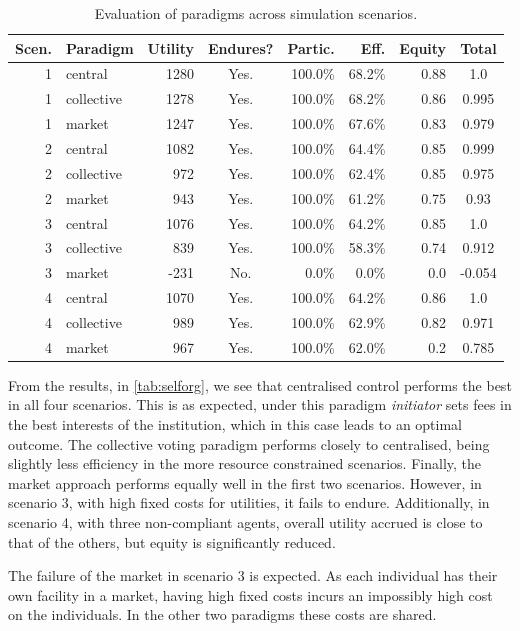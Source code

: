 \begin{table}
\centering
\caption{Evaluation of paradigms across simulation scenarios.}\label{tab:selforg}
\begin{tabular}{r|l||r|c|r|r|r||c}
Scen. & Paradigm & Utility & Endures? & Partic. & Eff. & Equity & Total \\
\hline \hline
1 & central & 1280 & Yes. & 100.0\% & 68.2\% & 0.88 & 1.0 \\
1 & collective & 1278 & Yes. & 100.0\% & 68.2\% & 0.86 & 0.995 \\
1 & market & 1247 & Yes. & 100.0\% & 67.6\% & 0.83 & 0.979 \\
\hline
2 & central & 1082 & Yes. & 100.0\% & 64.4\% & 0.85 & 0.999 \\
2 & collective & 972 & Yes. & 100.0\% & 62.4\% & 0.85 & 0.975 \\
2 & market & 943 & Yes. & 100.0\% & 61.2\% & 0.75 & 0.93 \\
\hline
3 & central & 1076 & Yes. & 100.0\% & 64.2\% & 0.85 & 1.0 \\
3 & collective & 839 & Yes. & 100.0\% & 58.3\% & 0.74 & 0.912 \\
3 & market & -231 & No. & 0.0\% & 0.0\% & 0.0 & -0.054 \\
\hline
4 & central & 1070 & Yes. & 100.0\% & 64.2\% & 0.86 & 1.0 \\
4 & collective & 989 & Yes. & 100.0\% & 62.9\% & 0.82 & 0.971 \\
4 & market & 967 & Yes. & 100.0\% & 62.0\% & 0.2 & 0.785 \\
\end{tabular}
\end{table}

From the results, in \autoref{tab:selforg}, we see that centralised control
performs the best in all four scenarios. This is as expected, under this
paradigm \emph{initiator} sets fees in the best interests of the institution,
which in this case leads to an optimal outcome. The collective voting paradigm
performs closely to centralised, being slightly less efficiency in the more
resource constrained scenarios. Finally, the market approach performs equally
well in the first two scenarios. However, in scenario 3, with high fixed costs
for utilities, it fails to endure. Additionally, in scenario 4, with three
non-compliant agents, overall utility accrued is close to that of the others,
but equity is significantly reduced.

The failure of the market in scenario 3 is expected. As each individual has
their own facility in a market, having high fixed costs incurs an impossibly
high cost on the individuals. In the other two paradigms these costs are
shared.

